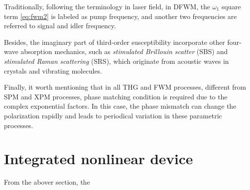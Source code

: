 Traditionally, following the terminology in laser field, in DFWM, the $\omega_1$ square term \autoref{eq:fwm2} is labeled as pump frequency, and another two frequencies are referred to signal and idler frequency.

Besides, the imaginary part of third-order susceptibility incorporate other four-wave absorption mechanics, such as \textit{stimulated Brillouin scatter} (SBS) and \textit{stimulated Raman scattering} (SRS), which originate from acoustic waves in crystals and vibrating molecules.

Finally, it worth mentioning that in all THG and FWM processes, different from SPM and XPM processes, phase matching condition is required due to the complex exponential factors. In this case, the phase mismatch can change the polarization rapidly and leads to periodical variation in these parametric processes.

\section{Integrated nonlinear device}

From the abover section, the 